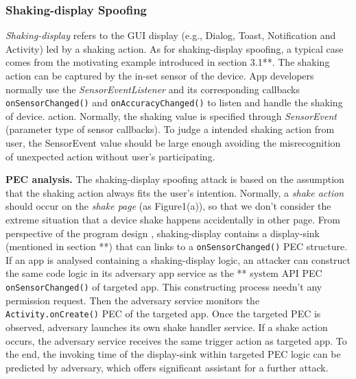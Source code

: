 \subsubsection{Shaking-display Spoofing}
\textit{Shaking-display} refers to the GUI display (e.g., Dialog, Toast, Notification and Activity) led by a shaking action. As for shaking-display spoofing, a typical case comes from the motivating example introduced in section 3.1**. The shaking action can be captured by the in-set sensor of the device. App developers normally use the \textit{SensorEventListener} and its corresponding callbacks \texttt{onSensorChanged()} and \texttt{onAccuracyChanged()} to listen and handle the shaking of device. action. Normally, the shaking value is specified through \textit{SensorEvent} (parameter type of sensor callbacks). To judge a intended shaking action from user, the SensorEvent value should be large enough avoiding the misrecognition of unexpected action without user's participating.

\textbf{PEC analysis.} The shaking-display spoofing attack is based on the assumption that the shaking action always fits the user's intention. Normally, a \textit{shake action} should occur on the \textit{shake page} (as Figure1(a)), so that we don't consider the extreme situation that a device shake happens accidentally in other page. From perspective of the program design , shaking-display contains a display-sink (mentioned in section **) that can links to a \texttt{onSensorChanged()} PEC structure. If an app is analysed containing a shaking-display logic,  an attacker can construct the same code logic in its adversary app service as the ** system API PEC \texttt{onSensorChanged()} of targeted app. This constructing process needn't any permission request. Then the adversary service monitors the \texttt{Activity.onCreate()} PEC of the targeted app. Once the targeted PEC is observed, adversary launches its own shake handler service. If a shake action occurs, the adversary service receives the same trigger action as targeted app. To the end, the invoking time of the display-sink within targeted PEC logic can be predicted by adversary, which offers significant assistant for a further attack. 


